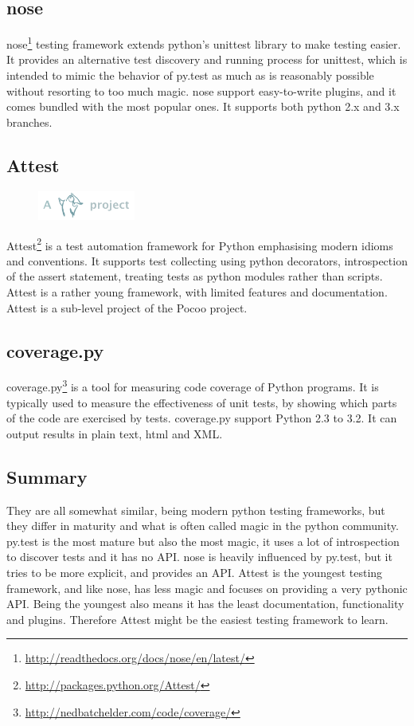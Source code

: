 \subsection{nose}
nose\footnote{\url{http://readthedocs.org/docs/nose/en/latest/}} testing
framework extends python's unittest library to make testing easier.
It provides an alternative test discovery and running process for unittest,
which is intended to mimic the behavior of py.test as much as is reasonably
possible without resorting to too much magic. nose support easy-to-write
plugins, and it comes bundled with the most popular ones. It supports both
python 2.x and 3.x branches.

\subsection{Attest}
\begin{figure}
	\vspace{-20pt}
	\includegraphics[width=3.2cm]{./planning/img/pocoo_logo}
	\vspace{-30pt}
\end{figure}
Attest\footnote{\url{http://packages.python.org/Attest/}} is a test automation
framework for Python emphasising modern idioms and conventions. It supports
test collecting using python decorators, introspection of the assert statement,
treating tests as python modules rather than scripts. Attest is a rather young
framework, with limited features and documentation. Attest is a sub-level
project of the Pocoo project.

\subsection{coverage.py}
coverage.py\footnote{\url{http://nedbatchelder.com/code/coverage/}} is a tool
for measuring code coverage of Python programs. It is typically used to measure
the effectiveness of unit tests, by showing which parts of the code are
exercised by tests. coverage.py support Python 2.3 to 3.2. It can output
results in plain text, html and XML.

\subsection{Summary}
They are all somewhat similar, being modern python testing frameworks, but they
differ in maturity and what is often called magic in the python community.
py.test is the most mature but also the most magic, it uses a lot of
introspection to discover tests and it has no API. nose is heavily influenced
by py.test, but it tries to be more explicit, and provides an API. Attest is
the youngest testing framework, and like nose, has less magic and focuses on
providing a very pythonic API. Being the youngest also means it has the least
documentation, functionality and plugins. Therefore Attest might be the easiest
testing framework to learn.


